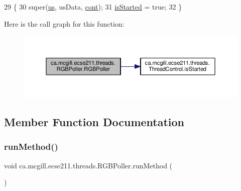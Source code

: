 \begin{DoxyCode}
29                                 \{
30     super(\hyperlink{classca_1_1mcgill_1_1ecse211_1_1threads_1_1_light_poller_ab6a9cb770bbf71f586697633db1475ff}{us}, usData, \hyperlink{classca_1_1mcgill_1_1ecse211_1_1threads_1_1_light_poller_ab6a9050ced4f6940add4735c8872194a}{cont});
31     \hyperlink{classca_1_1mcgill_1_1ecse211_1_1threads_1_1_thread_control_a92f4933511db42476e39956246bcf2fe}{isStarted} = \textcolor{keyword}{true};
32   \}
\end{DoxyCode}
Here is the call graph for this function\+:\nopagebreak
\begin{figure}[H]
\begin{center}
\leavevmode
\includegraphics[width=350pt]{classca_1_1mcgill_1_1ecse211_1_1threads_1_1_r_g_b_poller_a7e23e2fe527b2ecbf4ddc8f988dd70a5_cgraph}
\end{center}
\end{figure}


\subsection{Member Function Documentation}
\mbox{\label{classca_1_1mcgill_1_1ecse211_1_1threads_1_1_r_g_b_poller_a96db4561c87136de5098497fe30356fe}} 
\subsubsection{\texorpdfstring{run\+Method()}{runMethod()}}
{\footnotesize\ttfamily void ca.\+mcgill.\+ecse211.\+threads.\+R\+G\+B\+Poller.\+run\+Method (\begin{DoxyParamCaption}{ }\end{DoxyParamCaption})\hspace{0.3cm}{\ttfamily [protected]}}

